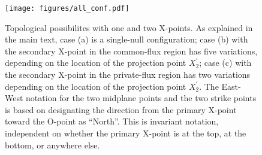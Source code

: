 \newpage

\begin{figure}[H]
    \centering
    \texttt{[image: figures/all\_conf.pdf]}

    \caption{Topological possibilites with one and two X-points. As
    explained in the main text, case (a) is a single-null
    configuration; case (b) with the secondary X-point in the
    common-flux region has five variations, depending on the location
    of the projection point $X_2^{\prime}$; case (c) with the
    secondary X-point in the private-flux region has two variations
    depending on the location of the projection point $X_2^{\prime}$.
    The East-West notation for the two midplane points and the two
    strike points is based on designating the direction from the
    primary X-point toward the O-point as ``North''. This is invariant
    notation, independent on whether the primary X-point is at the
    top, at the bottom, or anywhere else.}

    \label{fig:all_conf}
\end{figure}





